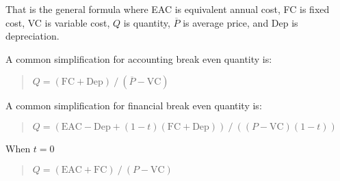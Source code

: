 That is the general formula where EAC is equivalent annual cost, FC is
fixed cost, VC is variable cost, $Q$ is quantity, $\overline{P}$ is
average price, and Dep is depreciation.

A common simplification for \textrm{accounting} break even quantity is:

\blockquote{$Q=(\mathrm{FC}+\text{Dep})~/~(\overline{P} - \mathrm{VC})$}

A common simplification for \textrm{financial} break even quantity is:

\blockquote{$Q = (\mathrm{EAC}-\text{Dep}+(1-t)(\mathrm{FC}+\text{Dep}))~/~((P-\mathrm{VC})(1-t))$}

When $t=0$
\blockquote{$Q = (\mathrm{EAC}+\mathrm{FC})~/~(P-\mathrm{VC})$}
